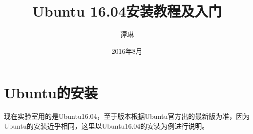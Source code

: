 \documentclass{article}
\begin{document}
\title{\vspace{-2em}Ubuntu 16.04安装教程及入门\vspace{0.7em}}%
\author{谭琳}%
\date{\vspace{-0.7em}2016年8月\vspace{-0.7em}}%
\maketitle\thispagestyle{fancy}%


\setcounter{page}{0}


\newpage

\tableofcontents 
\newpage

\pagestyle{fancy}

\newpage
\renewcommand{\headrulewidth}{0.4pt}
\renewcommand{\footrulewidth}{0.4pt}
            

\section{Ubuntu的安装}

现在实验室用的是Ubuntu16.04，至于版本根据Ubuntu官方出的最新版为准，因为Ubuntu的安装近乎相同，这里以Ubuntu16.04的安装为例进行说明。
\end{document}
